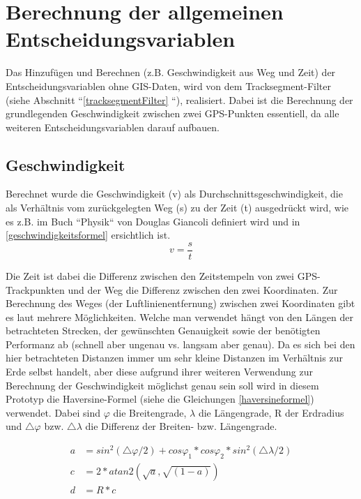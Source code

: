\section{Berechnung der allgemeinen Entscheidungsvariablen}
Das Hinzufügen und Berechnen (z.B. Geschwindigkeit aus Weg und Zeit) der Entscheidungsvariablen ohne GIS-Daten, wird von dem Tracksegment-Filter (siehe Abschnitt ``\ref{tracksegmentFilter} ``), realisiert. Dabei ist die Berechnung der grundlegenden Geschwindigkeit zwischen zwei GPS-Punkten essentiell, da alle weiteren Entscheidungsvariablen darauf aufbauen. 

\subsection{Geschwindigkeit}
Berechnet wurde die Geschwindigkeit (v) als Durchschnittsgeschwindigkeit, die als Verhältnis vom zurückgelegten Weg (s) zu der Zeit (t) ausgedrückt wird, wie es z.B. im Buch ``Physik`` von Douglas Giancoli definiert wird \cite[S.~27]{douglas_giancoli_physik_2010} und in \ref{geschwindigkeitsformel} ersichtlich ist. 
\begin{equation}
v = \frac{s}{t}
\label{geschwindigkeitsformel}
\end{equation}

Die Zeit ist dabei die Differenz zwischen den Zeitstempeln von zwei GPS-Trackpunkten und der Weg die Differenz zwischen den zwei Koordinaten. Zur Berechnung des Weges (der Luftlinienentfernung) zwischen zwei Koordinaten gibt es laut \cite{movable_type_ltd_calculate_2015} mehrere Möglichkeiten. Welche man verwendet hängt von den Längen der betrachteten Strecken, der gewünschten Genauigkeit sowie der benötigten Performanz ab (schnell aber ungenau vs. langsam aber genau). Da es sich bei den hier betrachteten Distanzen immer um sehr kleine Distanzen im Verhältnis zur Erde selbst handelt, aber diese aufgrund ihrer weiteren Verwendung zur Berechnung der Geschwindigkeit möglichst genau sein soll wird in diesem Prototyp die Haversine-Formel (siehe die Gleichungen \ref{haversineformel}) verwendet. Dabei sind $\varphi$ die Breitengrade, $\lambda$ die Längengrade, R der Erdradius und $\triangle\varphi$ bzw. $\triangle \lambda$ die Differenz der Breiten- bzw. Längengrade.\cite{movable_type_ltd_calculate_2015}

\begin{equation}
\label{haversineformel}
\begin{aligned}
a &= sin^{2}(\triangle \varphi/2) + cos \varphi_1  * cos \varphi_2 * sin^{2}(\triangle \lambda/2) \\
c &= 2 * atan2( \sqrt{a}, \sqrt{(1-a)}) \\
d &= R * c
\end{aligned}
\end{equation}

